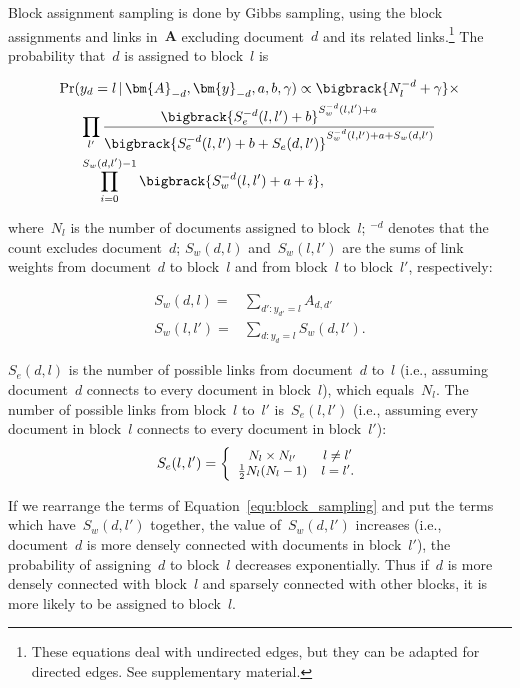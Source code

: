 Block assignment sampling is done by Gibbs sampling, using the block
assignments and links in~$\bm{A}$ excluding document~$d$ and its
related links.\footnote{These equations deal with undirected edges,
  but they can be adapted for directed edges. See supplementary
  material.}  The probability that~$d$ is assigned to block~$l$
is\par\nobreak
\begin{small}
\begin{align}
\Pr ( &y_d=l \,|\, \bm{A}_{-d}, \bm{y}_{-d}, a, b, \gamma ) \propto \bigbrack{N_l^{-d}+\gamma} \times \notag\\
&\prod_{l'} \frac {\bigbrack{S_e^{-d}(l,l') + b}^{S_w^{-d}(l,l') + a}} {\bigbrack{S_e^{-d}(l,l') + b + S_e(d,l')}^{S_w^{-d}(l,l') + a + S_w(d,l')}} \notag\\
&\prod_{i=0}^{S_w(d,l') - 1} \bigbrack{S_w^{-d}(l,l') + a + i}, \label{equ:block_sampling}
\end{align}
\end{small}
\noindent where~$N_l$ is the number of documents assigned to block~$l$;
$^{-d}$ denotes that the count excludes document~$d$;
$S_w(d,l)$ and~$S_w(l,l')$ are the sums of link weights from document~$d$ to block~$l$ and from block~$l$ to block~$l'$, respectively:\par\nobreak
\begin{small}
\begin{align}
S_w(d,l) =& \sum_{d': y_{d'} = l} A_{d,d'}\\
S_w(l,l') =& \sum_{d: y_d = l} S_w(d,l').
\end{align}
\end{small}

\noindent $S_e(d,l)$ is the number of possible links from document~$d$
to~$l$ (i.e., assuming document~$d$ connects to every document in
block~$l$), which equals~$N_l$.  The number of possible links from
block~$l$ to~$l'$ is~$S_e(l,l')$ (i.e., assuming every document in
block~$l$ connects to every document in block~$l'$):
\begin{equation}
\small
S_e(l,l')=
\left\{
    \begin{array}{cc}
        N_l\times N_{l'} & l\neq l'\\
        \frac{1}{2} N_l (N_l-1) & l=l'.
    \end{array}
\right.
\end{equation}

If we rearrange the terms of Equation~\ref{equ:block_sampling} and put
the terms which have~$S_w(d,l')$ together, the value of~$S_w(d,l')$
increases (i.e., document~$d$ is more densely connected with documents
in block~$l'$), the probability of assigning~$d$ to block~$l$
decreases exponentially. Thus if~$d$ is more densely connected with
block~$l$ and sparsely connected with other blocks, it is
more likely to be assigned to block~$l$.

